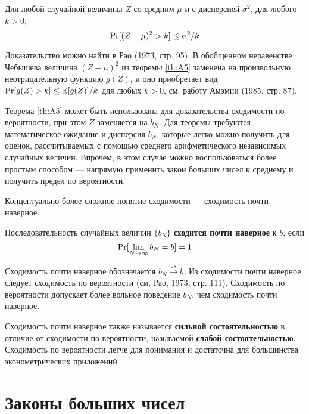 \begin{theorem}
\label{th:A5}
Для любой случайной величины $Z$ со средним $\mu$ и с дисперсией $\sigma^2$, для любого $k > 0$,
\begin{equation}
\P[(Z-\mu)^2>k]\leq \sigma^2/k
\end{equation}
\end{theorem}

Доказательство можно найти в Рао (1973, стр. 95). В обобщенном неравенстве Чебышева величина $(Z-\mu)^2$ из теоремы \ref{th:A5} заменена на произвольную неотрицательную функцию $g(Z)$, и оно приобретает вид $\P[g(Z)>k]\leq \E[g(Z)]/k$ для любых $k>0$, см. работу Амэмии (1985, стр. 87).

Теорема \ref{th:A5} может быть использована для доказательства сходимости по вероятности, при этом $Z$ заменяется на $b_N$. Для  теоремы требуются математическое ожидание и дисперсия $b_N$, которые легко можно получить для оценок, рассчитываемых с помощью среднего арифметического независимых случайных величин. Впрочем, в этом случае можно воспользоваться более простым способом --- напрямую применить закон больших чисел к среднему и получить предел по вероятности.

Концептуально более сложное понятие сходимости --- сходимость почти наверное.

\begin{definition} Последовательность случайных величин $\{b_N\}$ \textbf{сходится почти наверное } к $b$, если
\begin{equation}
\P[\lim_{N\to\infty} b_N = b] = 1
\end{equation}
\end{definition}
Сходимость почти наверное обозначается $b_N \overset{as}{\to} b$. Из сходимости почти наверное следует сходимость по вероятности (см. Рао, 1973, стр. 111). Сходимость по вероятности допускает более вольное поведение $b_N$, чем сходимость почти наверное.

Сходимость почти наверное также называется \textbf{сильной состоятельностью} в отличие от сходимости по вероятности, называемой \textbf{слабой состоятельностью}. Сходимость по вероятности легче для понимания и достаточна для большинства эконометрических приложений.



\section{Законы больших чисел}

